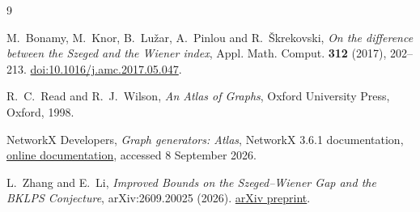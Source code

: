 \documentclass[11pt,reqno]{amsart}
\theoremstyle{definition}
\theoremstyle{remark}
\begin{document}
\begin{thebibliography}{9}

M.~Bonamy, M.~Knor, B.~Lu\v{z}ar, A.~Pinlou and R.~\v{S}krekovski,
\emph{On the difference between the Szeged and the Wiener index},
Appl. Math. Comput. \textbf{312} (2017), 202--213.
\href{https://doi.org/10.1016/j.amc.2017.05.047}{doi:10.1016/j.amc.2017.05.047}.

R.~C.~Read and R.~J.~Wilson,
\emph{An Atlas of Graphs}, Oxford University Press, Oxford, 1998.

NetworkX Developers,
\emph{Graph generators: Atlas}, NetworkX 3.6.1 documentation,
\href{https://networkx.org/documentation/stable/reference/generated/networkx.generators.atlas.graph_atlas_g.html}{online documentation},
accessed 8 September 2026.

L.~Zhang and E.~Li,
\emph{Improved Bounds on the Szeged--Wiener Gap and the BKLPS Conjecture},
arXiv:2609.20025 (2026).
\href{https://arxiv.org/abs/2609.20025}{arXiv preprint}.

\end{thebibliography}
\end{document}
